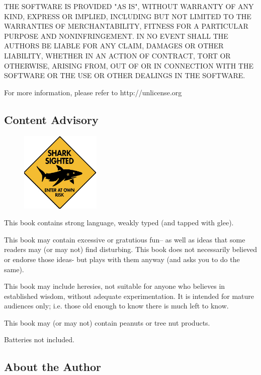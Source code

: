 \documentclass[9pt,twocolumn]{article}
\begin{document}
THE SOFTWARE IS PROVIDED "AS IS", WITHOUT WARRANTY OF ANY KIND,
EXPRESS OR IMPLIED, INCLUDING BUT NOT LIMITED TO THE WARRANTIES OF
MERCHANTABILITY, FITNESS FOR A PARTICULAR PURPOSE AND NONINFRINGEMENT.
IN NO EVENT SHALL THE AUTHORS BE LIABLE FOR ANY CLAIM, DAMAGES OR
OTHER LIABILITY, WHETHER IN AN ACTION OF CONTRACT, TORT OR OTHERWISE,
ARISING FROM, OUT OF OR IN CONNECTION WITH THE SOFTWARE OR THE USE OR
OTHER DEALINGS IN THE SOFTWARE.

For more information, please refer to http://unlicense.org


\newpage

\subsection*{Content Advisory }
\begin{figure}
  \includegraphics[width=1.5in]{img/shark.jpg}
  \end{figure}
This book contains strong language, weakly typed (and tapped with glee).

This book may contain excessive or gratutious fun--
as well as ideas that some readers may (or may not) find disturbing.
This book does not necessarily 
believed or endorse those ideas- but plays with them anyway
(and asks you to do the same).

This book may include heresies, not suitable for anyone  who believes in established wisdom, without
adequate experimentation. It is
intended for mature audiences only; i.e.  those
old enough to know there is much left to know. 

This book may (or may not) contain peanuts or tree nut products.

Batteries not included.

\vfill



   \subsection*{About the Author}
\end{document}
